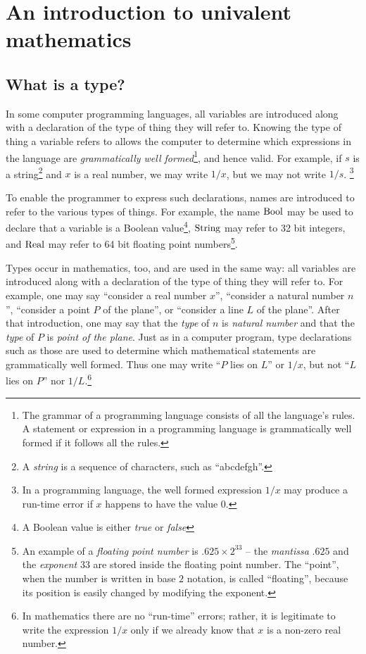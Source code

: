 \chapter{An introduction to univalent mathematics}
\label{ch:univalent-mathematics}

\section{What is a type?}
\label{sec:what-is-a-type}

In some computer programming languages, all variables are introduced along with a declaration of the type of thing they will refer to.  Knowing
the type of thing a variable refers to allows the computer to determine which expressions in the language are \emph{grammatically well
formed}\footnote{The grammar of a programming language consists of all the language's rules.  A statement or expression in a programming
language is grammatically well formed if it follows all the rules.}, and hence valid.  For example, if $s$ is a
string\footnote{A \emph{string} is a sequence of characters, such as ``abcdefgh''.} and $x$ is a real number, we may write $1/x$, but we may not write $1/s$.%
\footnote{In a programming language, the well formed expression $1/x$ may produce a run-time error if $x$ happens to have the value $0$.}

To enable the programmer to express such declarations, names are introduced to refer to the various types of things.  For example, the name
$\mathrm{Bool}$ may be used to declare that a variable is a Boolean value\footnote{A Boolean value is either \emph{true} or \emph{false}},
  $\mathrm{String}$ may refer to 32 bit integers, and $\mathrm{Real}$ may refer to 64 bit floating point numbers\footnote{An example of a \emph{floating
point number} is $.625 \times 2^{33}$ -- the \emph{mantissa} $.625$ and the \emph{exponent} $33$ are stored inside the floating point number.
The ``point'', when the number is written in base $2$ notation, is called ``floating'', because its position is easily changed by modifying the exponent.}.

Types occur in mathematics, too, and are used in the same way: all variables are introduced along with a declaration of the type of thing they
will refer to. For example, one may say ``consider a real number $x$'', ``consider a natural number $n$'', ``consider a point $P$ of
the plane'', or ``consider a line $L$ of the plane''.  After that introduction, one may say that the \emph{type} of $n$ is \emph{natural number} and
that the \emph{type} of $P$ is \emph{point of the
plane}.  Just as in a computer program, type declarations such as those are used to determine which mathematical statements are grammatically
well formed.  Thus one may write ``$P$ lies on $L$'' or $1/x$, but not ``$L$ lies on $P$'' nor $1/L$.\footnote{In mathematics there are no
``run-time'' errors; rather, it is legitimate to write the expression $1/x$ only if we already know that $x$ is a non-zero real number.}

